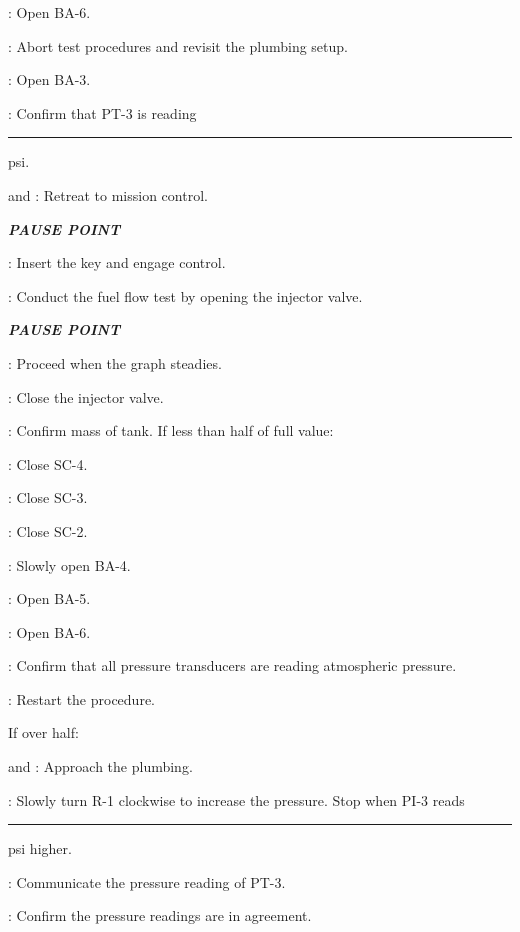 \begin{checklist}
\begin{checklist}
            \item \primary{}: Open BA-6. 
            \item \ops{}: Abort test procedures and revisit the plumbing setup. 
    \end{checklist}
    \item \primary{}: Open BA-3.
    \item \daq{}: Confirm that PT-3 is reading \rule{5em}{0.4pt} psi.
    \item \primary{} and \secondary{}: Retreat to mission control.
    \item \textbf{\textit{PAUSE POINT}}
    \item \control{}: Insert the key and engage control. 
    \item \control{}: Conduct the fuel flow test by opening the injector valve.
    \item \textbf{\textit{PAUSE POINT}}
    \item \ops{}: Proceed when the graph steadies.
    \item \control{}: Close the injector valve. 
    \item \ops{}: Confirm mass of tank. If less than half of full value:
    \begin{checklist}
            \item \primary{}: Close SC-4.
            \item \primary{}: Close SC-3.
            \item \primary{}: Close SC-2.
            \item \primary{}: Slowly open BA-4. 
            \item \primary{}: Open BA-5. 
            \item \primary{}: Open BA-6. 
            \item \daq{}: Confirm that all pressure transducers are reading atmospheric pressure.
            \item \ops{}: Restart the procedure. 
    \end{checklist}
   \item If over half:
    \begin{checklist}
            \item \primary{} and \secondary{}: Approach the plumbing. 
            \item \primary{}: Slowly turn R-1 clockwise to increase the pressure. Stop when PI-3 reads \rule{5em}{0.4pt} psi higher.
            \item \daq{}: Communicate the pressure reading of PT-3. 
            \item \ops{}: Confirm the pressure readings are in agreement. 

\end{checklist}
\end{checklist}
